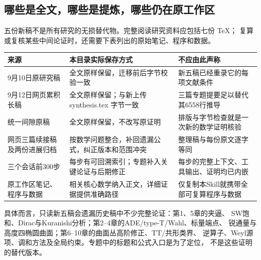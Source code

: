 \documentclass[UTF8,fontset=fandol,zihao=-4]{ctexart}
\begin{document}
\subsection{哪些是全文，哪些是提炼，哪些仍在原工作区}
五份新稿不是所有研究的无损替代物。完整阅读研究资料应包括七份 TeX；
复算或复核某些中间论证时，还需要下表列出的原始笔记、程序和数据。
\begin{longtable}{p{}p{}p{}}
\toprule 来源 & 本目录实际保存方式 & 不应由此声称\\\midrule\endhead
9月10日原研究稿 & 全文原样保留，迁移前后字节校验一致 & 新五稿已经重录它的每项文献条件\\
9月12日网页累积长稿 & 全文原样保留；与新上传 synthesis.tex 字节一致 & 三篇专题提要足以替代其6558行推导\\
统一间隙原稿 & 全文原样保留，不改写原证明 & 排版与字节检查就是一次新的数学证明核验\\
网页三篇续接稿及两份进展归档 & 按数学问题整合，补回遗漏公式，纠正版本和范围冲突 & 整理稿与每份原文逐字等同\\
三个会话前300步 & 每步有可回溯索引；专题补入关键论证与后期修正 & 每步的完整上下文、工具输出、证明均已内嵌\\
原工作区笔记、程序与数据 & 相关核心数学纳入正文，详细证据提供准确路径 & 仅复制本Skill就携带全部可复算程序与数据\\
\bottomrule
\end{longtable}

具体而言，只读新五稿会遗漏历史稿中不少完整论证：第1、5章的夹逼、
SW饱和、Dirac与Kuranishi分析；第2--4章的ADE/type-T/Wahl、标量端点、
锐通量与高度四椭圆曲面；第6--10章的曲面丛高阶修正、TT/共形类界、
逆算子、Weyl源项、调和方法及全局约束。专题中的标题和公式入口是为了定位，
不是这些证明的替代版本。
\end{document}
